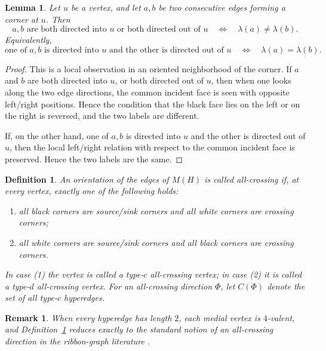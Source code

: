 \documentclass{article}
\newtheorem{lemma}[theorem]{Lemma}
\newtheorem{definition}[theorem]{Definition}
\newtheorem{remark}[theorem]{Remark}
\begin{document}
\begin{lemma}\label{lem:xy-angle}
Let $u$ be a vertex, and let $a,b$ be two consecutive edges forming a corner at $u$.
Then
\[\text{$a,b$ are both directed into $u$ or both directed out of $u$}
\quad\Longleftrightarrow\quad
\lambda(a)\ne \lambda(b).\]
Equivalently,
\[\text{one of $a,b$ is directed into $u$ and the other is directed out of $u$}
\quad\Longleftrightarrow\quad
\lambda(a)=\lambda(b).\]
\end{lemma}
\begin{proof}
This is a local observation in an oriented neighborhood of the corner. If $a$ and
$b$ are both directed into $u$, or both directed out of $u$, then when one looks
along the two edge directions, the common incident face is seen with opposite
left/right positions. Hence the condition that the black face lies on the left or
on the right is reversed, and the two labels are different.

If, on the other hand, one of $a,b$ is directed into $u$ and the other is directed out of $u$, then the local left/right relation with respect to the common incident face is preserved. Hence the two labels are the same.
\end{proof}

\begin{definition}\label{def:all-crossing}
An orientation of the edges of $M(H)$ is called \emph{all-crossing} if, at every vertex, exactly one of the following holds:
\begin{enumerate}
  \item all black corners are source/sink corners and all white corners are crossing corners;
  \item all white corners are source/sink corners and all black corners are crossing corners.
\end{enumerate}
In case (1) the vertex is called a \emph{type-$c$ all-crossing vertex}; in case (2) it is called a \emph{type-$d$ all-crossing vertex}. For an all-crossing direction $\Phi$, let $C(\Phi)$ denote the set of all type-$c$ hyperedges.
\end{definition}

\begin{remark}\label{rem:allcrossing-ribbon}
When every hyperedge has length $2$, each medial vertex is $4$-valent, and Definition~\ref{def:all-crossing} reduces exactly to the standard notion of an all-crossing direction in the ribbon-graph literature \cite{HuggettMoffatt2013,DengJinMetsidik2020}.
\end{remark}
\end{document}
